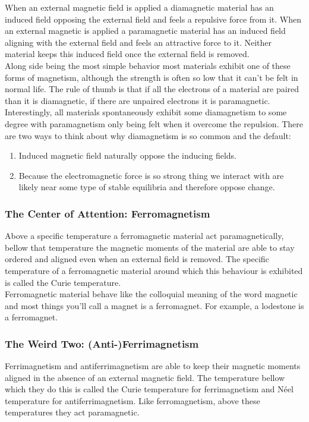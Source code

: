 When an external magnetic field is applied a diamagnetic material has an induced field opposing the external field and feels a repulsive force from it.
When an external magnetic is applied a paramagnetic material has an induced field aligning with the external field and feels an attractive force to it.
Neither material keeps this induced field once the external field is removed.
\\

Along side being the most simple behavior most materials exhibit one of these forms of magnetism,
although the strength is often so low that it can't be felt in normal life.
The rule of thumb is that if all the electrons of a material are paired than it is diamagnetic,
if there are unpaired electrons it is paramagnetic.
\\

Interestingly, all materials spontaneously exhibit some diamagnetism to some degree with paramagnetism only being felt when it overcome the repulsion.
There are two ways to think about why diamagnetism is so common and the default:
\begin{enumerate}
\item Induced magnetic field naturally oppose the inducing fields.
\item Because the electromagnetic force is so strong thing we interact with are likely near some type of stable equilibria and therefore oppose change.
\end{enumerate}

\subsubsection{The Center of Attention: Ferromagnetism}
Above a specific temperature a ferromagnetic material act paramagnetically,
bellow that temperature the magnetic moments of the material are able to stay ordered and aligned even when an external field is removed.
The specific temperature of a ferromagnetic material around which this behaviour is exhibited is called the Curie temperature.
\\

Ferromagnetic material behave like the colloquial meaning of the word magnetic and most things you'll call a magnet is a ferromagnet.
For example, a lodestone is a ferromagnet.

\subsubsection{The Weird Two: (Anti-)Ferrimagnetism}
Ferrimagnetism and antiferrimagnetism are able to keep their magnetic moments aligned in the absence of an external magnetic field.
The temperature bellow which they do this is called the Curie temperature for ferrimagnetism and Néel temperature for antiferrimagnetism.
Like ferromagnetism, above these temperatures they act paramagnetic. 
\\

